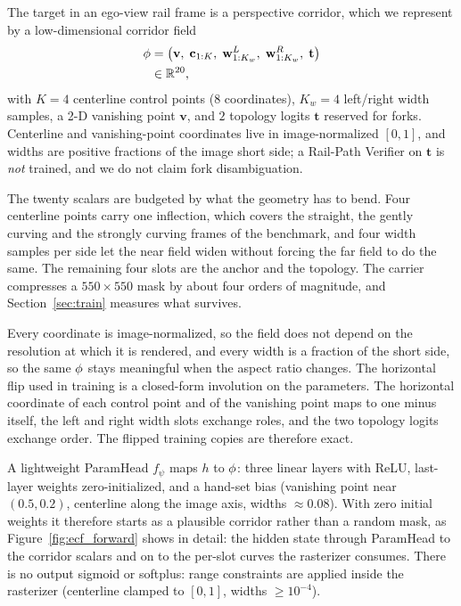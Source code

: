 The target in an ego-view rail frame is a perspective corridor, which we represent by a low-dimensional corridor field
\begin{equation}
\begin{aligned}
\phi
&= \big(
\mathbf{v},\;
\mathbf{c}_{1:K},\;
\mathbf{w}^{L}_{1:K_w},\;
\mathbf{w}^{R}_{1:K_w},\;
\mathbf{t}
\big) \\
&\in \mathbb{R}^{20},
\end{aligned}
\label{eq:phi}
\end{equation}
with $K{=}4$ centerline control points ($8$ coordinates), $K_w{=}4$ left/right width samples, a 2-D vanishing point $\mathbf{v}$, and $2$ topology logits $\mathbf{t}$ reserved for forks.
Centerline and vanishing-point coordinates live in image-normalized $[0,1]$, and widths are positive fractions of the image short side; a Rail-Path Verifier on $\mathbf{t}$ is \emph{not} trained, and we do not claim fork disambiguation.

The twenty scalars are budgeted by what the geometry has to bend. Four centerline points carry one inflection, which covers the straight, the gently curving and the strongly curving frames of the benchmark, and four width samples per side let the near field widen without forcing the far field to do the same. The remaining four slots are the anchor and the topology. The carrier compresses a $550{\times}550$ mask by about four orders of magnitude, and Section~\ref{sec:train} measures what survives.

Every coordinate is image-normalized, so the field does not depend on the resolution at which it is rendered, and every width is a fraction of the short side, so the same $\phi$ stays meaningful when the aspect ratio changes. The horizontal flip used in training is a closed-form involution on the parameters. The horizontal coordinate of each control point and of the vanishing point maps to one minus itself, the left and right width slots exchange roles, and the two topology logits exchange order. The flipped training copies are therefore exact.

A lightweight ParamHead $f_\psi$ maps $h$ to $\phi$: three linear layers with ReLU, last-layer weights zero-initialized, and a hand-set bias (vanishing point near $(0.5,0.2)$, centerline along the image axis, widths ${\approx}0.08$).
With zero initial weights it therefore starts as a plausible corridor rather than a random mask, as Figure~\ref{fig:ecf_forward} shows in detail: the \Seg{} hidden state through ParamHead to the corridor scalars and on to the per-slot curves the rasterizer consumes.
There is no output sigmoid or softplus: range constraints are applied inside the rasterizer (centerline clamped to $[0,1]$, widths $\ge 10^{-4}$).

